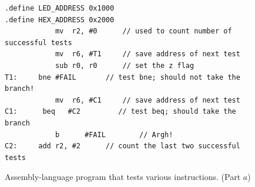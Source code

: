 \documentclass[epsfig,10pt,fullpage]{article}
\begin{document}
\vspace{-0.5cm}
\lstset{language=ASM,numbers=none,escapechar=|}
\begin{figure}[H]
\begin{center}
\begin{minipage}[h]{14 cm}
\begin{lstlisting}[name=proc]
.define LED_ADDRESS 0x1000
.define HEX_ADDRESS 0x2000
			mv 	r2, #0		// used to count number of successful tests
			mv 	r6, #T1		// save address of next test
			sub	r0, r0		// set the z flag
T1:		bne	#FAIL    	// test bne; should not take the branch!
			mv 	r6, #C1		// save address of next test
C1:      beq   #C2         // test beq; should take the branch
    		b	   #FAIL    	// Argh!
C2:		add	r2, #2		// count the last two successful tests
\end{lstlisting}
\end{minipage}
\caption{Assembly-language program that tests various instructions. (Part $a$)}
\label{fig:sitbooboosit}
\end{center}
\end{figure}
\end{document}
